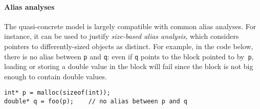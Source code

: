 


\paragraph{Alias analyses} The quasi-concrete model is largely
compatible with common alias analyses.  For instance, it can be used
to justify \textit{size-based alias analysis}, which considers
pointers to differently-sized objects as distinct. For example, in
the code below, there is no alias between \texttt{p} and \texttt{q}:
even if \texttt{q} points to the block
pointed to by~\texttt{p}, loading or storing a double value in the
block will fail since the block is not big enough to contain double
values.
\begin{lstlisting}
int* p = malloc(sizeof(int));
double* q = foo(p);    // no alias between p and q
\end{lstlisting}

